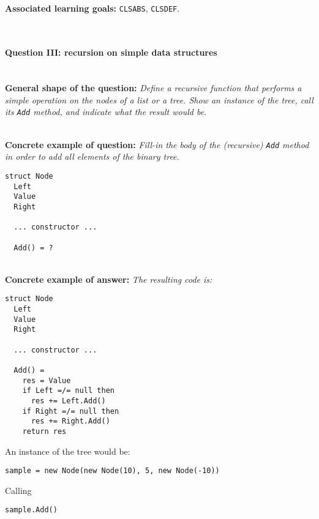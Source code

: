\ \\ 

\textbf{Associated learning goals:} \texttt{CLSABS}, \texttt{CLSDEF}.

\ \\ 


\paragraph{Question III: recursion on simple data structures} \ \\

\textbf{General shape of the question:} \textit{Define a recursive function that performs a simple operation on the nodes of a list or a tree. Show an instance of the tree, call its \texttt{Add} method, and indicate what the result would be.}

\ \\ 

\textbf{Concrete example of question:} \textit{Fill-in the body of the (recursive) \texttt{Add} method in order to add all elements of the binary tree.}

\begin{lstlisting}
struct Node
  Left
  Value
  Right
  
  ... constructor ...
  
  Add() = ?
\end{lstlisting}

\ \\ 

\textbf{Concrete example of answer:} \textit{The resulting code is:}

\begin{lstlisting}
struct Node
  Left
  Value
  Right
  
  ... constructor ...

  Add() = 
  	res = Value
  	if Left =/= null then
  	  res += Left.Add()
  	if Right =/= null then
  	  res += Right.Add()
  	return res
\end{lstlisting}

An instance of the tree would be:

\begin{lstlisting}
sample = new Node(new Node(10), 5, new Node(-10))
\end{lstlisting}

Calling

\begin{lstlisting}
sample.Add()
\end{lstlisting}

